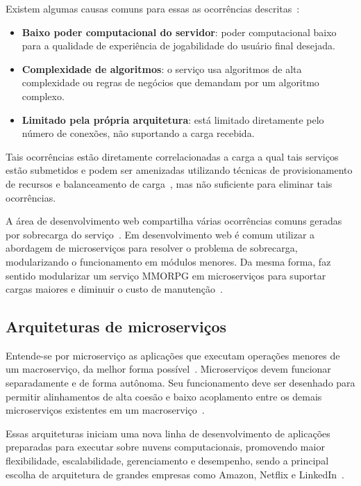 Existem algumas causas comuns para essas as ocorrências descritas~\cite{1417630}:

\begin{itemize}
  \item \textbf{Baixo poder computacional do servidor}: poder computacional baixo para a qualidade de experiência de jogabilidade do usuário final desejada.
  \item \textbf{Complexidade de algoritmos}: o serviço usa algoritmos de alta complexidade ou regras de negócios que demandam por um algoritmo complexo.
  \item \textbf{Limitado pela própria arquitetura}: está limitado diretamente pelo número de conexões, não suportando a carga recebida.
\end{itemize}

Tais ocorrências estão diretamente correlacionadas a carga a qual tais serviços estão submetidos e podem ser amenizadas utilizando técnicas de provisionamento de recursos e balanceamento de carga~\cite{1417630}, mas não suficiente para eliminar tais ocorrências.

A área de desenvolvimento web compartilha várias ocorrências comuns geradas por sobrecarga do serviço~\cite{7830692}.
%
Em desenvolvimento web é comum utilizar a abordagem de microserviços para resolver o problema de sobrecarga, modularizando o  funcionamento em módulos menores.
%
Da mesma forma, faz sentido modularizar um serviço \ac{MMORPG} em microserviços para suportar cargas maiores e diminuir o custo de manutenção~\cite{7515686}.

\subsection{Arquiteturas de microserviços}

Entende-se por microserviço as aplicações que executam operações menores de um macroserviço, da melhor forma possível~\cite{stephenclarkewillson2017}.
%
Microserviços devem funcionar separadamente e de forma autônoma.
%
Seu funcionamento deve ser desenhado para permitir alinhamentos de alta coesão e baixo acoplamento entre os demais microserviços existentes em um macroserviço~\cite{8169955}.



Essas arquiteturas iniciam uma nova linha de desenvolvimento de aplicações preparadas para executar sobre nuvens computacionais, promovendo maior flexibilidade, escalabilidade, gerenciamento e desempenho, sendo a principal escolha de arquitetura de grandes empresas como Amazon, Netflix e LinkedIn~\cite{7830692,7515686}.

